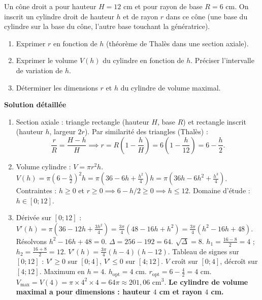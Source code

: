 \documentclass[11pt]{article}
\begin{document}
\begin{exoresolu}
Un cône droit a pour hauteur $H=12$ cm et pour rayon de base $R=6$ cm. On inscrit un cylindre droit de hauteur $h$ et de rayon $r$ dans ce cône (une base du cylindre sur la base du cône, l'autre base touchant la génératrice).
\begin{enumerate}
    \item Exprimer $r$ en fonction de $h$ (théorème de Thalès dans une section axiale).
    \item Exprimer le volume $V(h)$ du cylindre en fonction de $h$. Préciser l'intervalle de variation de $h$.
    \item Déterminer les dimensions $r$ et $h$ du cylindre de volume maximal.
\end{enumerate}
\tcblower
\textbf{Solution détaillée}
\begin{enumerate}
    \item Section axiale : triangle rectangle (hauteur $H$, base $R$) et rectangle inscrit (hauteur $h$, largeur $2r$). Par similarité des triangles (Thalès) :
    \[
    \frac{r}{R} = \frac{H-h}{H} \implies r = R\left(1 - \frac{h}{H}\right) = 6\left(1 - \frac{h}{12}\right) = 6 - \frac{h}{2}.
    \]
    
    \item Volume cylindre : $V = \pi r^2 h$.
    $V(h) = \pi \left(6 - \frac{h}{2}\right)^2 h = \pi \left(36 - 6h + \frac{h^2}{4}\right)h = \pi \left(36h - 6h^2 + \frac{h^3}{4}\right)$.
    Contraintes : $h \ge 0$ et $r \ge 0 \implies 6 - h/2 \ge 0 \implies h \le 12$.
    Domaine d'étude : \textbf{$h \in [0; 12]$}.
    
    \item Dérivée sur $[0; 12]$ :
    $V'(h) = \pi \left(36 - 12h + \frac{3h^2}{4}\right) = \frac{3\pi}{4} \left(48 - 16h + h^2\right) = \frac{3\pi}{4} (h^2 - 16h + 48)$.
    Résolvons $h^2 - 16h + 48 = 0$. $\Delta = 256 - 192 = 64$. $\sqrt{\Delta}=8$.
    $h_1 = \frac{16-8}{2} = 4$ ; $h_2 = \frac{16+8}{2} = 12$.
    $V'(h) = \frac{3\pi}{4}(h-4)(h-12)$.
    Tableau de signes sur $[0;12]$ : $V' \ge 0$ sur $[0;4]$, $V' \le 0$ sur $[4;12]$.
    $V$ croît sur $[0;4]$, décroît sur $[4;12]$. Maximum en $h=4$.
    $h_{\text{opt}} = 4$ cm. $r_{\text{opt}} = 6 - \frac{4}{2} = 4$ cm.
    $V_{\text{max}} = V(4) = \pi \times 4^2 \times 4 = 64\pi \approx 201,06 \text{ cm}^3$.
    \textbf{Le cylindre de volume maximal a pour dimensions : hauteur $4$ cm et rayon $4$ cm.}
\end{enumerate}
\end{exoresolu}
\end{document}
